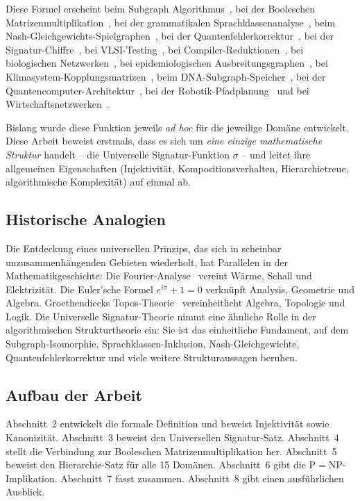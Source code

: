 ﻿\documentclass[a4paper,12pt]{article}
\theoremstyle{definition}
\begin{document}
Diese Formel erscheint beim Subgraph Algorithmus~\cite{epp2026subgraph},
bei der Booleschen Matrizenmultiplikation~\cite{epp2026boolmm},
bei der grammatikalen Sprachklassenanalyse~\cite{epp2026grammatik},
beim Nash-Gleichgewichts-Spielgraphen~\cite{epp2026spieltheorie},
bei der Quantenfehlerkorrektur~\cite{epp2026qecc},
bei der Signatur-Chiffre~\cite{epp2026sigchiffre},
bei VLSI-Testing~\cite{epp2026vlsi},
bei Compiler-Reduktionen~\cite{epp2026ccl},
bei biologischen Netzwerken~\cite{epp2026gen},
bei epidemiologischen Ausbreitungsgraphen~\cite{epp2026hantavirus},
bei Klimasystem-Kopplungsmatrizen~\cite{epp2026klima},
beim DNA-Subgraph-Speicher~\cite{epp2026dna},
bei der Quantencomputer-Architektur~\cite{epp2026qsubgraph},
bei der Robotik-Pfadplanung~\cite{epp2026robophi} und
bei Wirtschaftsnetzwerken~\cite{epp2026spieltheorie}.

Bislang wurde diese Funktion jeweils \emph{ad hoc} f\"ur die jeweilige Domäne
entwickelt. Diese Arbeit beweist erstmals, dass es sich um \emph{eine einzige
mathematische Struktur} handelt -- die Universelle Signatur-Funktion $\sigma$ --
und leitet ihre allgemeinen Eigenschaften (Injektivit\"at, Kompositionsverhalten,
Hierarchietreue, algorithmische Komplexit\"at) auf einmal ab.

\subsection{Historische Analogien}

Die Entdeckung eines universellen Prinzips, das sich in scheinbar unzusammenh\"angenden
Gebieten wiederholt, hat Parallelen in der Mathematikgeschichte:
Die Fourier-Analyse~\cite{fourier1822} vereint W\"arme, Schall und Elektrizit\"at.
Die Euler'sche Formel $e^{i\pi}+1=0$ verkn\"upft Analysis, Geometrie und Algebra.
Groethendiecks Topos-Theorie~\cite{grothendieck1960} vereinheitlicht Algebra,
Topologie und Logik.
Die Universelle Signatur-Theorie nimmt eine \"ahnliche Rolle in der
algorithmischen Strukturtheorie ein: Sie ist das einheitliche Fundament, auf dem
Subgraph-Isomorphie, Sprachklassen-Inklusion, Nash-Gleichgewichte,
Quantenfehlerkorrektur und viele weitere Strukturaussagen beruhen.

\subsection{Aufbau der Arbeit}

Abschnitt~2 entwickelt die formale Definition und beweist Injektivit\"at
sowie Kanonizit\"at. Abschnitt~3 beweist den Universellen Signatur-Satz.
Abschnitt~4 stellt die Verbindung zur Booleschen Matrizenmultiplikation her.
Abschnitt~5 beweist den Hierarchie-Satz f\"ur alle 15 Domänen.
Abschnitt~6 gibt die P$=$NP-Implikation. Abschnitt~7 fasst zusammen.
Abschnitt~8 gibt einen ausf\"uhrlichen Ausblick.
\end{document}
